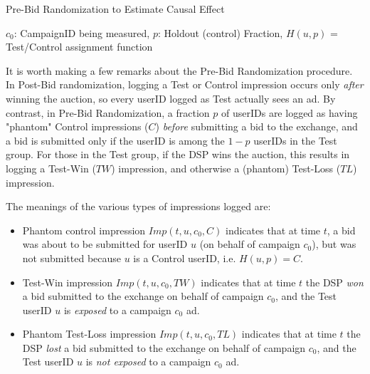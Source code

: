 \documentclass[11pt,a4paper]{article}
\theoremstyle{definition}
\theoremstyle{remark}
\theoremstyle{definition}
\theoremstyle{definition}
\theoremstyle{definition}
\theoremstyle{definition}
\theoremstyle{definition}
\theoremstyle{definition}
\begin{document}
\begin{algorithm} 
 \caption{\small Pre-Bid Randomization to Estimate Causal Effect}
    \label{alg:pre-bid}
\begin{algorithmic}[1]
\Require 
$c_0$: CampaignID being measured, 
$p$: Holdout (control) Fraction,
$H(u,p)$ = Test/Control assignment function
 
 

\Else {}	 
		\EndIf
	\EndIf
\EndIf			
\EndWhile
\end{algorithmic}	
\end{algorithm}


It is worth making a few remarks about the Pre-Bid Randomization procedure. In Post-Bid randomization, logging a Test or Control impression occurs only {\em after} winning the auction, so every userID logged as Test actually sees an ad. By contrast, in Pre-Bid Randomization, a fraction $p$ of userIDs are logged as having "phantom" Control impressions ($C$) {\em before} submitting a bid to the exchange, and a bid is submitted only if the userID is among the $1-p$ userIDs in the Test group. For those in the Test group, if the DSP wins the auction, this results in logging a Test-Win ($TW$) impression, and otherwise a (phantom) Test-Loss ($TL$) impression. 

The meanings of the various types of impressions logged are:
\begin{itemize}
	\item Phantom control impression $Imp(t, u, c_0, C)$ indicates that at time $t$, a bid was about to be submitted for userID $u$ (on behalf of campaign $c_0$), but was not submitted because $u$ is a Control userID, i.e. $H(u,p) = C$.
	\item Test-Win impression $Imp(t, u, c_0, TW)$ indicates that at time $t$ the DSP {\em won} a bid submitted to the exchange on behalf of campaign $c_0$, and the Test userID $u$ is {\em exposed} to a campaign $c_0$ ad.
	\item Phantom Test-Loss impression $Imp(t, u, c_0, TL)$ indicates that at time $t$ the DSP \textit{lost} a bid submitted to the exchange on behalf of campaign $c_0$, and the Test userID $u$ is {\em not exposed} to a campaign $c_0$ ad.
\end{itemize}
\end{document}
